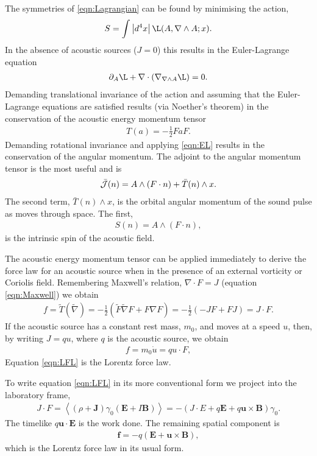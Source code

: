 \documentclass[10pt, fleqn,final,showtrims,oldfontcommands]{article} %
\newcommand{\eqa}[1]{\begin{align}#1\end{align}}
\newcommand{\eqnref}[1]{\ref{eqn:#1}}
\newcommand{\lr}[1]{\left( #1 \right)}
\renewcommand{\d}{\partial}
\newcommand{\del}{\nabla}
\newcommand{\abs}[1]{\left| #1 \right|}
\newcommand{\scope}[1]{\tilde{#1}}
\newcommand{\half}{\tfrac{1}{2}}
\newcommand{\vf}{\vect{f}}
\newcommand{\J}{{\cal J}}
\newcommand{\vJ}{\vect J}
\newcommand{\vE}{\vect E}
\newcommand{\vB}{\vect B}
\newcommand{\adjoint}[1]{\bar{#1}}
\newcommand{\scalar}[1]{\left< #1 \right>}
\newcommand{\g}{\gamma_0}
\newcommand{\vect}[1]{\mathbf{#1}}
\newcommand{\vu}{\textbf{u}}
\begin{document}
The symmetries of \eqnref{Lagrangian} can be found by minimising the action,
\begin{align}
  S =  \int \abs{d^4x} \L(A, \del\wedge A; x).
\end{align}
In the absence of acoustic sources ($J=0$) this results in the Euler-Lagrange equation 
\begin{align}
  \d_A \L + \del \cdot  \lr{\del_{\del\wedge A}\L} = 0. \label{eqn:EL}
\end{align}
Demanding translational invariance of the action and assuming that the
Euler-Lagrange equations are satisfied results (via Noether's theorem) in the conservation of the acoustic energy momentum tensor\cite{Lasenby1993,Doran2003}  
\eqa{
   T\lr{a} = -\half F a F.
} 
Demanding rotational invariance and applying \eqnref{EL} results in the conservation of the angular momentum.
The adjoint to the angular momentum tensor is the most useful and is\cite{Lasenby1993,Doran2003}  
\begin{align}
 \adjoint{\J}(n) = A \wedge \lr{F\cdot n} +  \adjoint{T}(n) \wedge x.
\end{align}
The second term,  $\adjoint{T}(n) \wedge x$, is the orbital angular momentum of the sound pulse as
moves through space.
The first,
\begin{align}
S(n) = A \wedge \lr{F\cdot n},
\end{align}
is the intrinsic spin of the  acoustic field.

The acoustic energy momentum tensor can be applied immediately to derive the 
 force law for an acoustic source when in the presence of an external vorticity or Coriolis field.
Remembering Maxwell's relation, $\del\cdot F = J$ (equation \eqnref{Maxwell})
we obtain 
\begin{align}
 f = \scope T(\scope \del) = -\half \lr{\scope F\scope \del F + F \del F} = -\half \lr{-JF +FJ} = J \cdot F.
\end{align}
If the acoustic source has a constant rest mass, $m_0$, and moves at a speed $u$,
then, by writing  $J = q u$, where $q$ is the acoustic source, we obtain
\begin{align}
  f = m_0 \dot u = q u \cdot F, \label{eqn:LFL}
\end{align}
Equation \eqnref{LFL}  is the Lorentz force law.

To write equation \eqnref{LFL} in its more conventional form we project into the laboratory frame,
\begin{align}
J\cdot F  = \scalar{\lr{\rho + \vJ} \g\lr{\vE+I\vB}} = -\lr{J\cdot E + q \vE + q \vu\times\vB }\g.
\end{align}
The timelike $q\vu\cdot\vE $ is the work done.
The remaining spatial component is
\begin{align}
   \vf = -q \lr{\vE + \vu \times \vB},
\end{align}
which is the Lorentz force law in its usual form.
\end{document}
